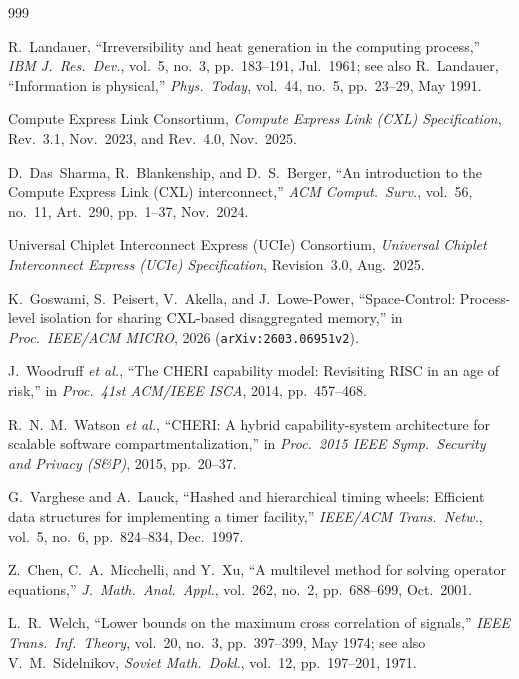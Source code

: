 \documentclass[11pt,letterpaper]{article}
\theoremstyle{spectralthm}
\begin{document}
\begin{thebibliography}{999}
\footnotesize

R.~Landauer, ``Irreversibility and heat generation in the computing process,'' \textit{IBM J.\ Res.\ Dev.}, vol.~5, no.~3, pp.~183--191, Jul.\ 1961; see also R.~Landauer, ``Information is physical,'' \textit{Phys.\ Today}, vol.~44, no.~5, pp.~23--29, May 1991.

Compute Express Link Consortium, \textit{Compute Express Link (CXL) Specification}, Rev.~3.1, Nov.\ 2023, and Rev.~4.0, Nov.\ 2025.

D.~Das~Sharma, R.~Blankenship, and D.~S.~Berger, ``An introduction to the Compute Express Link (CXL) interconnect,'' \textit{ACM Comput.\ Surv.}, vol.~56, no.~11, Art.~290, pp.~1--37, Nov.\ 2024.

Universal Chiplet Interconnect Express (UCIe) Consortium, \textit{Universal Chiplet Interconnect Express (UCIe) Specification}, Revision~3.0, Aug.\ 2025.

K.~Goswami, S.~Peisert, V.~Akella, and J.~Lowe-Power, ``Space-Control: Process-level isolation for sharing CXL-based disaggregated memory,'' in \textit{Proc.\ IEEE/ACM MICRO}, 2026 (\texttt{arXiv:2603.06951v2}).

J.~Woodruff \textit{et al.}, ``The CHERI capability model: Revisiting RISC in an age of risk,'' in \textit{Proc.\ 41st ACM/IEEE ISCA}, 2014, pp.~457--468.

R.~N.~M.~Watson \textit{et al.}, ``CHERI: A hybrid capability-system architecture for scalable software compartmentalization,'' in \textit{Proc.\ 2015 IEEE Symp.\ Security and Privacy (S\&P)}, 2015, pp.~20--37.

G.~Varghese and A.~Lauck, ``Hashed and hierarchical timing wheels: Efficient data structures for implementing a timer facility,'' \textit{IEEE/ACM Trans.\ Netw.}, vol.~5, no.~6, pp.~824--834, Dec.\ 1997.

Z.~Chen, C.~A.~Micchelli, and Y.~Xu, ``A multilevel method for solving operator equations,'' \textit{J.\ Math.\ Anal.\ Appl.}, vol.~262, no.~2, pp.~688--699, Oct.\ 2001.

L.~R.~Welch, ``Lower bounds on the maximum cross correlation of signals,'' \textit{IEEE Trans.\ Inf.\ Theory}, vol.~20, no.~3, pp.~397--399, May 1974; see also V.~M.~Sidelnikov, \textit{Soviet Math.\ Dokl.}, vol.~12, pp.~197--201, 1971.


\end{thebibliography}
\end{document}

